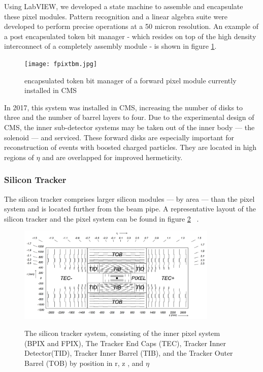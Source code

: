 Using LabVIEW, we developed a state machine to assemble and encapsulate these pixel modules. Pattern recognition and a linear algebra suite were developed to perform precise operations at a 50 micron resolution. An example of a post encapsulated token bit manager - which resides on top of the high density interconnect of a completely assembly module - is shown in figure \ref{fig:tbm}.

\begin{figure}[ht!b]
    \centering
  \texttt{[image: fpixtbm.jpg]}
    \caption{\label{fig:tbm} encapsulated token bit manager of a forward pixel module currently installed in CMS}
\end{figure}


In 2017, this system was installed in CMS, increasing the number of disks to three and the number of barrel layers to four.  Due to the experimental design of CMS, the inner sub-detector systems may be taken out of the inner body --- the solenoid --- and serviced.  
These forward disks are especially important for reconstruction of events with boosted charged particles. They are located in high regions of $\eta$ and are overlapped for improved hermeticity.  


\subsubsection{Silicon Tracker}
The silicon tracker comprises larger silicon modules --- by area --- than the pixel system and is located further from the beam pipe. A representative layout of the silicon tracker and the pixel system can be found in figure \ref{fig:tracker} ~\cite{Chatrchyan:2008zzk}. 

\begin{figure}[ht!b]
\label{fig:tracker}
  \centering
  \includegraphics[width=0.85\textwidth]{figures/silicon/SiliconTracker.png}\\
    \caption{ The silicon tracker system, consisting of the inner pixel system (BPIX and FPIX), The Tracker End Caps (TEC), Tracker Inner Detector(TID), Tracker Inner Barrel (TIB), and the Tracker Outer Barrel (TOB) by position in r, z , and $\eta$ ~\cite{Chatrchyan:2008zzk}}
\end{figure}



